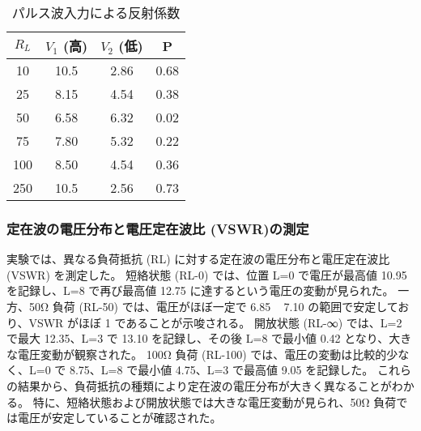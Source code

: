 \documentclass[a4paper,11pt,xelatex,ja=standard]{bxjsarticle}
\begin{document}
            \begin{center}
                \begin{table}[H]
                    \caption{パルス波入力による反射係数}
                    \centering
                    \begin{tabular}{|c|c|c|c|}
                        \hline
                        $R_L$ & $V_1$ (高) & $V_2$ (低) & P \\
                        \hline
                        10 & 10.5 & 2.86 & 0.68 \\
                        \hline
                        25 & 8.15 & 4.54 & 0.38 \\
                        \hline
                        50 & 6.58 & 6.32 & 0.02 \\
                        \hline
                        75 & 7.80 & 5.32 & 0.22 \\
                        \hline
                        100 & 8.50 & 4.54 & 0.36 \\
                        \hline
                        250 & 10.5 & 2.56 & 0.73 \\
                        \hline
                    \end{tabular}
                \end{table}
            \end{center}
        
        \subsubsection{定在波の電圧分布と電圧定在波比 (VSWR)の測定}

            実験では、異なる負荷抵抗 (RL) に対する定在波の電圧分布と電圧定在波比 (VSWR) を測定した。
            短絡状態 (RL-0) では、位置 L=0 で電圧が最高値 10.95 を記録し、L=8 で再び最高値 12.75 に達するという電圧の変動が見られた。
            一方、50Ω 負荷 (RL-50) では、電圧がほぼ一定で 6.85 ~ 7.10 の範囲で安定しており、VSWR がほぼ 1 であることが示唆される。
            開放状態 (RL-∞) では、L=2 で最大 12.35、L=3 で 13.10 を記録し、その後 L=8 で最小値 0.42 となり、大きな電圧変動が観察された。
            100Ω 負荷 (RL-100) では、電圧の変動は比較的少なく、L=0 で 8.75、L=8 で最小値 4.75、L=3 で最高値 9.05 を記録した。
            これらの結果から、負荷抵抗の種類により定在波の電圧分布が大きく異なることがわかる。
            特に、短絡状態および開放状態では大きな電圧変動が見られ、50Ω 負荷では電圧が安定していることが確認された。
\end{document}
